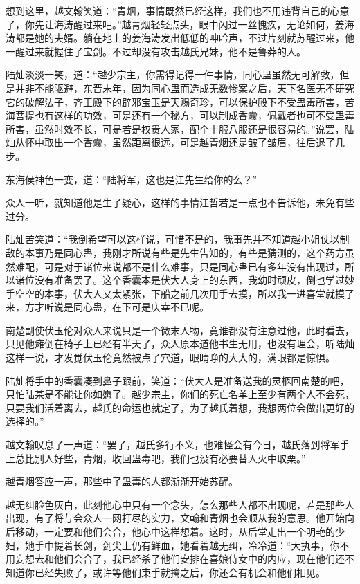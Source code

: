 想到这里，越文翰笑道：“青烟，事情既然已经这样，我们也不用违背自己的心意了，你先让海涛醒过来吧。”越青烟轻轻点头，眼中闪过一丝愧疚，无论如何，姜海涛都是她的夫婿。躺在地上的姜海涛发出低低的呻吟声，不过片刻就苏醒过来，他一醒过来就握住了宝剑。不过却没有攻击越氏兄妹，他不是鲁莽的人。

陆灿淡淡一笑，道：“越少宗主，你需得记得一件事情，同心蛊虽然无可解救，但是并非不能驱避，东晋末年，因为同心蛊而造成无数惨案之后，天下名医无不研究它的破解法子，齐王殿下的辟邪宝玉是天赐奇珍，可以保护殿下不受蛊毒所害，苦海菩提也有这样的功效，可是还有一个秘方，可以制成香囊，佩戴者也可不受蛊毒所害，虽然时效不长，可是若是权贵人家，配个十服八服还是很容易的。”说罢，陆灿从怀中取出一个香囊，虽然距离很远，可是越青烟还是皱了皱眉，往后退了几步。

东海侯神色一变，道：“陆将军，这也是江先生给你的么？”

众人一听，就知道他是生了疑心，这样的事情江哲若是一点也不告诉他，未免有些过分。

陆灿苦笑道：“我倒希望可以这样说，可惜不是的，我事先并不知道越小姐仗以制敌的本事乃是同心蛊，我刚才所说有些是先生告知的，有些是猜测的，这个药方虽然难配，可是对于诸位来说都不是什么难事，只是同心蛊已有多年没有出现过，所以诸位没有准备罢了。这个香囊本是伏大人身上的东西，我幼时顽皮，倒也学过妙手空空的本事，伏大人又太紧张，下船之前几次用手去摸，所以我一进喜堂就摸了来，方才听说是同心蛊，在下可是庆幸不已呢。

南楚副使伏玉伦对众人来说只是一个微末人物，竟谁都没有注意过他，此时看去，只见他瘫倒在椅子上已经有半天了，众人原本道他书生无用，也没有理会，听陆灿这样一说，才发觉伏玉伦竟然被点了穴道，眼睛睁的大大的，满眼都是惊惧。

陆灿将手中的香囊凑到鼻子跟前，笑道：“伏大人是准备送我的灵柩回南楚的吧，只怕陆某是不能让你如愿了。越少宗主，你们的死亡名单上至少有两个人不会死，只要我们活着离去，越氏的命运也就定了，为了越氏着想，我想两位会做出更好的选择的。”

越文翰叹息了一声道：“罢了，越氏多行不义，也难怪会有今日，越氏落到将军手上总比别人好些，青烟，收回蛊毒吧，我们也没有必要替人火中取栗。”

越青烟答应一声，那些中了蛊毒的人都渐渐开始苏醒。

越无纠脸色灰白，此刻他心中只有一个念头，怎么那些人都不出现呢，若是那些人出现，有了将与会众人一网打尽的实力，文翰和青烟也会顺从我的意思。他开始向后移动，一定要和他们会合，他心中这样想着。这时，从后堂走出一个明艳的少妇，她手中提着长剑，剑尖上仍有鲜血，她看着越无纠，冷冷道：“大执事，你不用妄想去和他们会合了，我已经杀了他们安排在喜娘侍女中的内应，现在他们还不知道你已经失败了，或许等他们束手就擒之后，你还会有机会和他们相见。

